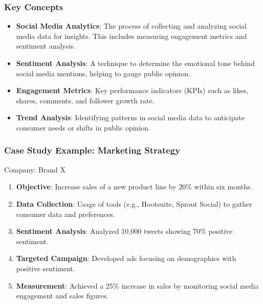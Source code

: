 \documentclass{beamer}
\begin{document}
\begin{frame}[fragile]
    \frametitle{Key Concepts}
    \begin{itemize}
        \item \textbf{Social Media Analytics}: The process of collecting and analyzing social media data for insights. This includes measuring engagement metrics and sentiment analysis.
        
        \item \textbf{Sentiment Analysis}: A technique to determine the emotional tone behind social media mentions, helping to gauge public opinion.
        
        \item \textbf{Engagement Metrics}: Key performance indicators (KPIs) such as likes, shares, comments, and follower growth rate.
        
        \item \textbf{Trend Analysis}: Identifying patterns in social media data to anticipate consumer needs or shifts in public opinion.
    \end{itemize}
\end{frame}

\begin{frame}[fragile]
    \frametitle{Case Study Example: Marketing Strategy}
    \begin{block}{Company: Brand X}
        \begin{enumerate}
            \item \textbf{Objective}: Increase sales of a new product line by 20\% within six months.
            \item \textbf{Data Collection}: Usage of tools (e.g., Hootsuite, Sprout Social) to gather consumer data and preferences.
            \item \textbf{Sentiment Analysis}: Analyzed 10,000 tweets showing 70\% positive sentiment.
            \item \textbf{Targeted Campaign}: Developed ads focusing on demographics with positive sentiment.
            \item \textbf{Measurement}: Achieved a 25\% increase in sales by monitoring social media engagement and sales figures.
        \end{enumerate}
    \end{block}
\end{frame}
\end{document}
